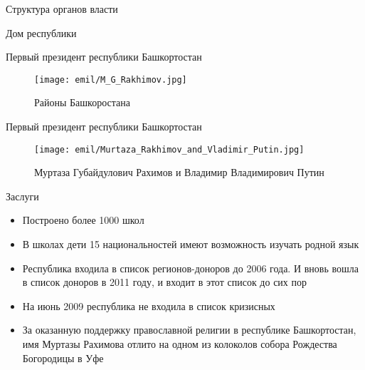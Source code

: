 


\begin{frame}{Структура органов власти}

    
\end{frame}

\begin{frame}{Дом республики}

    
\end{frame}

\begin{frame}{Первый президент республики Башкортостан}

\begin{figure}[h!]
	\begin{center}
		{\texttt{[image: emil/M\_G\_Rakhimov.jpg]}}
		\caption{Районы Башкоростана}
	\end{center}
\end{figure}

\end{frame}


\begin{frame}{Первый президент республики Башкортостан}

\begin{figure}[h!]
	\begin{center}
		{\texttt{[image: emil/Murtaza\_Rakhimov\_and\_Vladimir\_Putin.jpg]}}
		\caption{Муртаза Губайдулович Рахимов и Владимир Владимирович Путин}
	\end{center}
\end{figure}

\end{frame}

\begin{frame}{Заслуги}

\begin{itemize}
	\item Построено более 1000 школ
	\item В школах дети 15 национальностей имеют возможность изучать родной язык
	\item Республика входила в список регионов-доноров до 2006 года. И вновь вошла в список доноров в 2011 году, и входит в этот список до сих пор
	\item На июнь 2009 республика не входила в список кризисных
	\item За оказанную поддержку православной религии в республике Башкортостан, имя Муртазы Рахимова отлито на одном из колоколов собора Рождества Богородицы в Уфе
\end{itemize}

\end{frame}

